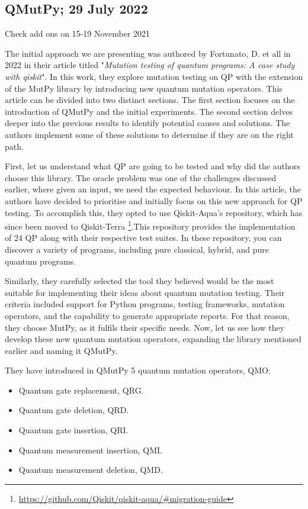 \begin{itemize}
\vspace{15pt}
\subsection{QMutPy; 29 July 2022}
\label{Ch3.2.4:QMutPy}

Check add ons on 15-19 November 2021 \cite{fortunato2022qmutpy}

The initial approach we are presenting was authored by Fortunato, D. et all in 2022 in their article titled "\textit{Mutation testing of quantum programs: A case study with qiskit}"\cite{fortunato2022mutation}. In this work, they explore mutation testing on QP with the extension of the MutPy library by introducing new quantum mutation operators. This article can be divided into two distinct sections. The first section focuses on the introduction of QMutPy and the initial experiments. The second section delves deeper into the previous results to identify potential causes and solutions. The authors implement some of these solutions to determine if they are on the right path. \newline

First, let us understand what QP are going to be tested and why did the authors choose this library. The oracle problem was one of the challenges discussed earlier, where given an input, we need the expected behaviour. In this article, the authors have decided to prioritise and initially focus on this new approach for QP testing. To accomplish this, they opted to use Qiskit-Aqua's repository, which has since been moved to Qiskit-Terra \footnote{\url{https://github.com/Qiskit/qiskit-aqua/\#migration-guide}}.This repository provides the implementation of 24 QP along with their respective test suites. In these repository, you can discover a variety of programs, including pure classical, hybrid, and pure quantum programs.\newline

Similarly, they carefully selected the tool they believed would be the most suitable for implementing their ideas about quantum mutation testing. Their criteria included support for Python programs, testing frameworks, mutation operators, and the capability to generate appropriate reports. For that reason, they choose MutPy, as it fulfils their specific needs. Now, let us see how they develop these new quantum mutation operators, expanding the library mentioned earlier and naming it QMutPy.\newline

They have introduced in QMutPy 5 quantum mutation operators, QMO:
\begin{itemize}
    \item Quantum gate replacement, QRG.
    \item Quantum gate deletion, QRD.
    \item Quantum gate insertion, QRI.
    \item Quantum measurement insertion, QMI.
    \item Quantum measurement deletion, QMD.
\end{itemize}


\end{itemize}
